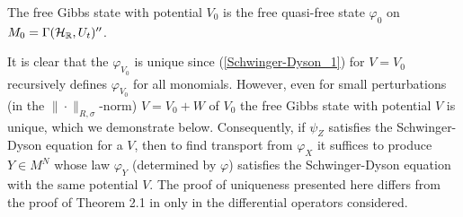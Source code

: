 \begin{thm}\label{free_Gibbs_is_free_quasi-free}
The free Gibbs state with potential $V_0$ is the free quasi-free state $\varphi_0$ on $M_0=\Gamma(\mathcal H_{\mathbb{R}},U_t)''$.
\end{thm}\par

It is clear that the $\varphi_{V_0}$ is unique since (\ref{Schwinger-Dyson_1}) for $V=V_0$ recursively defines $\varphi_{V_0}$ for all monomials. However, even for small perturbations (in the $\|\cdot\|_{R,\sigma}$-norm) $V=V_0+W$  of $V_0$ the free Gibbs state with potential $V$ is unique, which we demonstrate below. Consequently, if $\psi_Z$ satisfies the Schwinger-Dyson equation for a $V$, then to find transport from $\varphi_X$ it suffices to produce $Y\in M^N$ whose law $\varphi_Y$ (determined by $\varphi$) satisfies the Schwinger-Dyson equation with the same potential $V$. The proof of uniqueness presented here differs from the proof of Theorem 2.1 in \cite{GM06} only in the differential operators considered.


